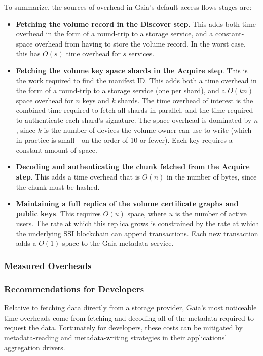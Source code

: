 To summarize, the sources of overhead in Gaia's default access flows stages are:

\begin{itemize}
\item \textbf{Fetching the volume record in the Discover step}.  This adds both time overhead in
the form of a round-trip to a storage service, and a constant-space overhead from having
to store the volume record.  In the worst case, this has $O(s)$ time overhead
for $s$ services.
\item \textbf{Fetching the volume key space shards in the Acquire step}.  This
is the work required to find the manifest ID.  This adds both a time
overhead in the form of a round-trip to a storage service (one per shard), and a
$O(kn)$ space overhead for $n$ keys and $k$ shards.  The time overhead of
interest is the combined time
required to fetch all shards in parallel, and the time required to authenticate
each shard's signature.  The space
overhead is dominated by $n$, since $k$ is the number of devices the volume
owner can use to write (which in practice is small---on the order of 10 or fewer).
Each key requires a constant amount of space.
\item \textbf{Decoding and authenticating the chunk fetched from the Acquire
step}. This adds a time overhead that is $O(n)$ in the number of bytes, since the chunk must
be hashed.
\item \textbf{Maintaining a full replica of the volume certificate graphs and public
keys}.  This requires $O(u)$ space, where $u$ is the number of active users.  The rate
at which this replica grows is constrained by the rate at which the underlying
SSI blockchain can append transactions.  Each new transaction adds a $O(1)$
space to the Gaia metadata service.
\end{itemize}

\subsubsection{Measured Overheads}


\subsubsection{Recommendations for Developers}

Relative to fetching data directly from a storage provider, Gaia's most
noticeable time overheads come from fetching and decoding all of the metadata
required to request the data.  Fortunately for developers, these costs can be
mitigated by metadata-reading and metadata-writing strategies in
their applications' aggregation drivers.

